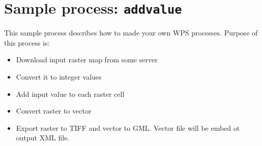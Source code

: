 \documentclass[a4paper,11pt]{article}
\begin{document}
    \section{Sample process: \texttt{addvalue}}
    This sample process describes how to made your own WPS processes. Purpose of this process is:
    \begin{itemize}
    \item  Download input raster map from some server
    \item  Convert it to integer values
    \item  Add input value to each raster cell
    \item  Convert raster to vector
    \item  Export raster to TIFF and vector to GML. Vector file will be embed ot output XML file.
    \end{itemize}
\end{document}
